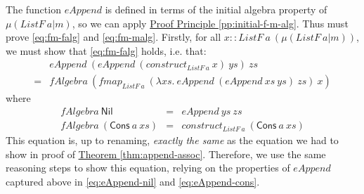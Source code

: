 \documentclass{jfp1}
\newcommand{\proofprinref}[1]{\hyperref[#1]{Proof Principle \ref*{#1}}}
\newcommand{\thmref}[1]{\hyperref[#1]{Theorem \ref*{#1}}}
\begin{document}
\begin{proof*}
  The function $\mathit{eAppend}$ is defined in terms of the initial
  algebra property of $\mu(\mathit{ListF}~a|m)$, so we can apply
  \proofprinref{pp:initial-f-m-alg}. Thus must prove
  \autoref{eq:fm-falg} and \autoref{eq:fm-malg}. Firstly, for all $x
  :: \mathit{ListF}~a~(\mu(\mathit{ListF}~a|m))$, we must show that
  \autoref{eq:fm-falg} holds, i.e. that:
  \begin{displaymath}
    \begin{array}{cl}
      &\mathit{eAppend}~(\mathit{eAppend}~(\mathit{construct}_{\mathit{ListF}~a}~x)~\mathit{ys})~\mathit{zs}\\
      =&\mathit{fAlgebra}~(\mathit{fmap}_{\mathit{ListF}~a}~(\lambda \mathit{xs}.~\mathit{eAppend}~(\mathit{eAppend}~\mathit{xs}~\mathit{ys})~\mathit{zs})~x)
    \end{array}
  \end{displaymath}
  where
  \begin{displaymath}
    \begin{array}{rcl}
      \mathit{fAlgebra}~\mathsf{Nil} &=& \mathit{eAppend}~\mathit{ys}~\mathit{zs} \\
      \mathit{fAlgebra}~(\mathsf{Cons}~a~\mathit{xs}) &=& \mathit{construct}_{\mathit{ListF}~a}~(\mathsf{Cons}~a~\mathit{xs})
    \end{array}
  \end{displaymath}
  This equation is, up to renaming, \emph{exactly the same} as the
  equation we had to show in proof of
  \thmref{thm:append-assoc}. Therefore, we use the same reasoning
  steps to show this equation, relying on the properties of
  $\mathit{eAppend}$ captured above in \autoref{eq:eAppend-nil} and
  \autoref{eq:eAppend-cons}.


\end{proof*}
\end{document}
